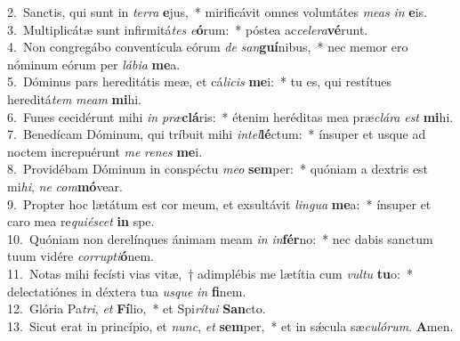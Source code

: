 {2.~}Sanctis, qui sunt in \textit{ter}\textit{ra} \textbf{e}jus,~* mirificávit omnes voluntátes \textit{me}\textit{as} \textit{in} \textbf{e}is.\\
{3.~}Multiplicátæ sunt infirmitá\textit{tes} \textit{e}\textbf{ó}rum:~* póstea ac\textit{ce}\textit{le}\textit{ra}\textbf{vé}runt.\\
{4.~}Non congregábo conventícula eórum \textit{de} \textit{san}\textbf{guí}nibus,~* nec memor ero nóminum eórum per \textit{lá}\textit{bi}\textit{a} \textbf{me}a.\\
{5.~}Dóminus pars hereditátis meæ, et cá\textit{li}\textit{cis} \textbf{me}i:~* tu es, qui restítues hereditá\textit{tem} \textit{me}\textit{am} \textbf{mi}hi.\\
{6.~}Funes cecidérunt mihi \textit{in} \textit{præ}\textbf{clá}ris:~* étenim heréditas mea præ\textit{clá}\textit{ra} \textit{est} \textbf{mi}hi.\\
{7.~}Benedícam Dóminum, qui tríbuit mihi \textit{in}\textit{tel}\textbf{lé}ctum:~* ínsuper et usque ad noctem increpuérunt \textit{me} \textit{re}\textit{nes} \textbf{me}i.\\
{8.~}Providébam Dóminum in conspéctu \textit{me}\textit{o} \textbf{sem}per:~* quóniam a dextris est mi\textit{hi}, \textit{ne} \textit{com}\textbf{mó}vear.\\
{9.~}Propter hoc lætátum est cor meum, et exsultávit \textit{lin}\textit{gua} \textbf{me}a:~* ínsuper et caro mea re\textit{qui}\textit{é}\textit{scet} \textbf{in} spe.\\
{10.~}Quóniam non derelínques ánimam meam \textit{in} \textit{in}\textbf{fér}no:~* nec dabis sanctum tuum vidére \textit{cor}\textit{rup}\textit{ti}\textbf{ó}nem.\\
{11.~}Notas mihi fecísti vias vitæ,~† adimplébis me lætítia cum \textit{vul}\textit{tu} \textbf{tu}o:~* delectatiónes in déxtera tua \textit{us}\textit{que} \textit{in} \textbf{fi}nem.\\
{12.~}Glória Pa\textit{tri}, \textit{et} \textbf{Fí}lio,~* et Spi\textit{rí}\textit{tu}\textit{i} \textbf{San}cto.\\
{13.~}Sicut erat in princípio, et \textit{nunc}, \textit{et} \textbf{sem}per,~* et in sǽcula sæ\textit{cu}\textit{ló}\textit{rum}. \textbf{A}men.\\
